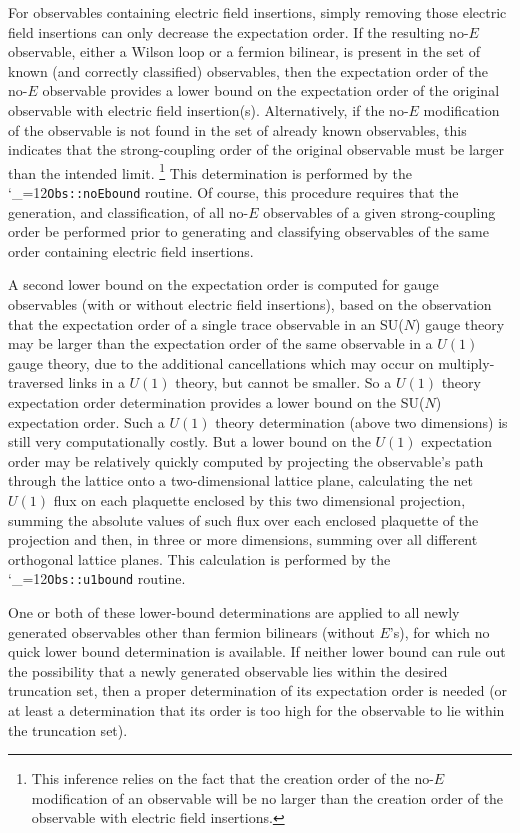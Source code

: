 \documentclass [12pt]{article}
\makeatletter
\renewcommand{\tt}{\begingroup\catcode`_=12\def\_{\string_}\tt@}
\newcommand{\tt@}[1]{\texttt{#1}\endgroup}
\makeatother
\begin{document}
For observables containing electric field insertions, simply removing
those electric field insertions can only decrease the expectation order.
If the resulting no-$E$ observable,
either a Wilson loop or a fermion bilinear, is present in the
set of known (and correctly classified) observables, then
the expectation order of the no-$E$ observable provides a lower bound
on the expectation order of the original observable with 
electric field insertion(s).
Alternatively, if the no-$E$ modification of the observable is not
found in the set of already known observables, this indicates that
the strong-coupling order of the original observable must be larger
than the intended limit.%
\footnote
    {%
    This inference relies on the fact that the creation order
    of the no-$E$ modification of an observable will be no larger
    than the creation order of the observable with electric field
    insertions.
    }
This determination is performed by the \tt{Obs::noEbound} routine.
Of course, this procedure requires that the generation, and classification,
of all no-$E$ observables of a given strong-coupling order 
be performed prior to generating and classifying observables
of the same order containing electric field insertions.

A second lower bound on the expectation order is computed for gauge observables
(with or without electric field insertions), based on the observation that
the expectation order of a single trace observable in an SU($N$) gauge theory may be
larger than the expectation order of the same observable in a $U(1)$
gauge theory, due to the additional cancellations which may occur on multiply-traversed
links in a $U(1)$ theory, but cannot be smaller.
So a $U(1)$ theory expectation order determination provides a lower bound on
the SU($N$) expectation order.
Such a $U(1)$ theory determination (above two dimensions) is still very
computationally costly.
But a lower bound on the $U(1)$ expectation order may be relatively quickly
computed by projecting the observable's path through the lattice
onto a two-dimensional lattice plane, calculating the net $U(1)$ flux on
each plaquette enclosed by this two dimensional projection, summing
the absolute values of such flux over each enclosed plaquette of the projection
and then, in three or more dimensions, summing over all different orthogonal
lattice planes.
This calculation is performed by the \tt{Obs::u1bound} routine.

One or both of these lower-bound determinations are applied to all
newly generated observables other than fermion bilinears (without $E$'s),
for which no quick lower bound determination is available.
If neither lower bound can rule out the possibility that a newly
generated observable lies within the desired truncation set,
then a proper determination of its expectation order is needed
(or at least a determination that its order is too high for
the observable to lie within the truncation set).
\end{document}
